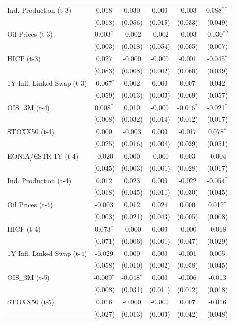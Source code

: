 \begin{longtable}[t]{lccccc}
Ind. Production (t-3) & 0.018 & 0.030 & 0.000 & -0.003 & 0.088$^{**}$\\
 & (0.018) & (0.056) & (0.015) & (0.033) & (0.049)\\
Oil Prices (t-3) & 0.003$^{*}$ & -0.002 & -0.002 & -0.003 & -0.030$^{**}$\\
 & (0.003) & (0.018) & (0.054) & (0.005) & (0.007)\\
HICP (t-3) & 0.027 & -0.000 & -0.000 & -0.001 & -0.045$^{*}$\\
 & (0.083) & (0.008) & (0.002) & (0.060) & (0.039)\\
1Y Infl. Linked Swap (t-3) & -0.067$^{*}$ & 0.002 & 0.000 & 0.007 & 0.042\\
 & (0.059) & (0.013) & (0.003) & (0.069) & (0.057)\\
OIS\_3M (t-4) & 0.008$^{*}$ & 0.010 & -0.000 & -0.016$^{*}$ & -0.021$^{*}$\\
 & (0.008) & (0.032) & (0.014) & (0.012) & (0.017)\\
STOXX50 (t-4) & 0.000 & -0.003 & 0.000 & -0.017 & 0.078$^{*}$\\
 & (0.025) & (0.016) & (0.004) & (0.039) & (0.051)\\
EONIA/€STR 1Y (t-4) & -0.020 & 0.000 & -0.000 & 0.003 & -0.004\\
 & (0.045) & (0.003) & (0.001) & (0.028) & \vphantom{1} (0.017)\\
Ind. Production (t-4) & 0.012 & 0.023 & 0.000 & -0.022 & -0.054$^{*}$\\
 & (0.018) & (0.045) & (0.011) & (0.030) & (0.045)\\
Oil Prices (t-4) & -0.003 & 0.012 & 0.024 & 0.000 & 0.012$^{*}$\\
 & (0.003) & (0.021) & (0.043) & (0.005) & (0.008)\\
HICP (t-4) & 0.073$^{*}$ & -0.000 & 0.000 & -0.000 & -0.018\\
 & (0.071) & (0.006) & (0.001) & (0.047) & (0.029)\\
1Y Infl. Linked Swap (t-4) & -0.029 & 0.000 & 0.000 & -0.001 & 0.005\\
 & (0.058) & (0.010) & (0.002) & (0.058) & (0.045)\\
OIS\_3M (t-5) & -0.009$^{*}$ & -0.048$^{*}$ & 0.000 & -0.006 & -0.013\\
 & (0.008) & (0.031) & (0.011) & (0.012) & (0.018)\\
STOXX50 (t-5) & 0.016 & -0.000 & -0.000 & 0.007 & -0.016\\
 & (0.027) & (0.013) & (0.003) & (0.042) & (0.048)\\

\end{longtable}
